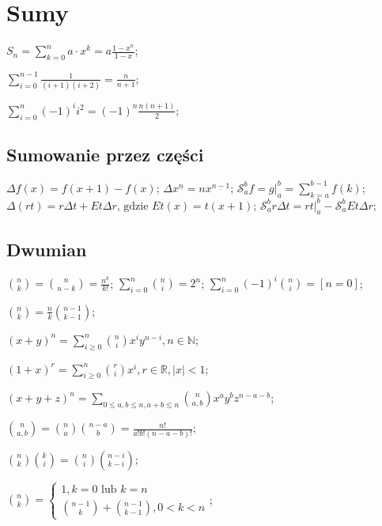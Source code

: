 \section{Sumy}

\entry
${S_n = \sum^{n}_{k = 0} a \cdot x^k} = {a \frac{1 - x^{n}}{1 - x}}$;

\entry
$\sum_{i=0}^{n-1}\frac{1}{(i+1)(i+2)} = \frac{n}{n+1}$;

\entry
$\sum_{i=0}^{n}(-1)^i i^2 = (-1)^n\frac{n(n+1)}{2}$;

\subsection{Sumowanie przez części}

\entry
${\Delta f(x) = f(x + 1) - f(x)}$;
\entry
${\Delta x^{\underline{n}}} = {n x^{\underline{n - 1}}}$;
\entry
${\mathcal{S}^{b}_{a} f}={g |^b_a} = {\sum^{b - 1}_{k = a} f(k)}$;
\entry
${\Delta (rt)} = {r \Delta t + E t \Delta r \text{, gdzie } E t(x)} =
  {t(x + 1)}$;
  \entry
${\mathcal{S}^{b}_{a} r \Delta t}= {r t |^b_a - \mathcal{S}^b_a E t \Delta r}$;

\subsection{Dwumian}

\entry
${\binom{n}{k} = \binom{n}{n - k} = {\frac{n^{\underline{k}}}{k!}}}$;
\entry
${\sum_{i = 0}^n \binom{n}{i} = 2^n}$;
\entry
${\sum_{i = 0}^{n} (-1)^i \binom{n}{i} = [ n = 0 ]}$;

\entry
$\binom{n}{k} = \frac{n}{k} \binom{n - 1}{k - 1}$;

\entry
${(x + y)^n = \sum_{i \geq 0}^n \binom{n}{i} x^i y^{n-i}, n \in \mathbb{N}}$;

\entry
${(1 + x)^r = \sum_{i \geq 0}^n \binom{r}{i} x^i, r \in \mathbb{R}, |x| < 1}$;

\entry
$(x + y + z)^n =
  \sum_{0 \leq a, b \leq n, a+b \leq n} \binom{n}{a,b} x^a y^b z^{n-a-b}$;

\entry
$\binom{n}{a,b} = \binom{n}{a}\binom{n-a}{b} = \frac{n!}{a! b! (n - a - b)!}$;

\entry
$\binom{n}{k}\binom{k}{i} = \binom{n}{i}\binom{n-i}{k-i}$;

\entry
$\binom{n}{k} = \begin{cases}
    1, k = 0 \text{ lub } k = n \\
    \binom{n - 1}{k} + \binom{n - 1}{k - 1}, 0 < k < n
\end{cases}
$;

